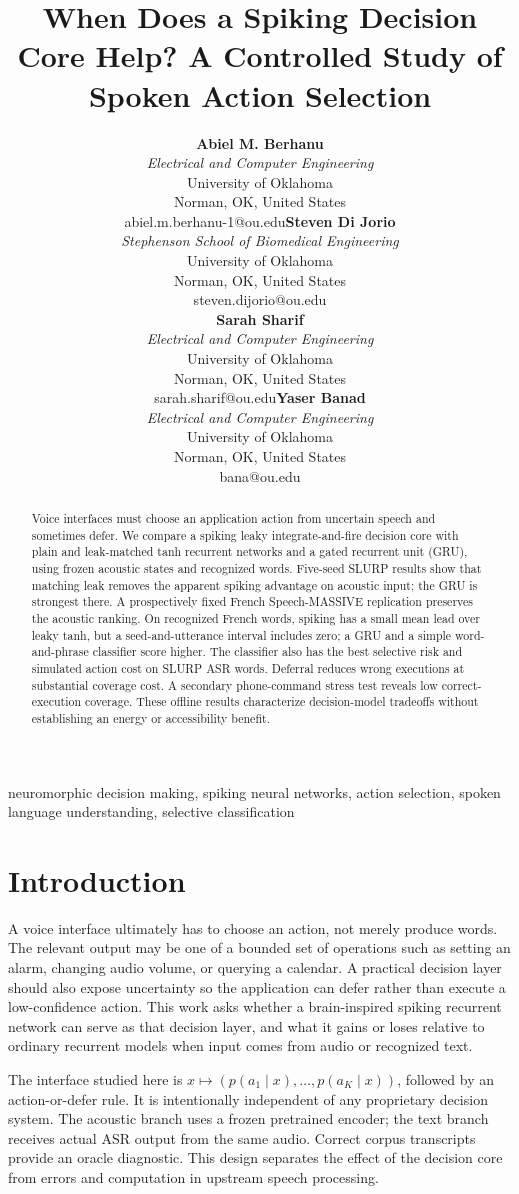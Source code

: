 \documentclass[conference]{IEEEtran}
\title{When Does a Spiking Decision Core Help? A Controlled Study of Spoken Action Selection}
\author{\begin{tabular}{cc}
\parbox{0.46\textwidth}{\centering\textbf{Abiel M. Berhanu}\\
\textit{Electrical and Computer Engineering}\\University of Oklahoma\\
Norman, OK, United States\\abiel.m.berhanu-1@ou.edu} &
\parbox{0.46\textwidth}{\centering\textbf{Steven Di Jorio}\\
\textit{Stephenson School of Biomedical Engineering}\\University of Oklahoma\\
Norman, OK, United States\\steven.dijorio@ou.edu}\\[1.5em]
\parbox{0.46\textwidth}{\centering\textbf{Sarah Sharif}\\
\textit{Electrical and Computer Engineering}\\University of Oklahoma\\
Norman, OK, United States\\sarah.sharif@ou.edu} &
\parbox{0.46\textwidth}{\centering\textbf{Yaser Banad}\\
\textit{Electrical and Computer Engineering}\\University of Oklahoma\\
Norman, OK, United States\\bana@ou.edu}
\end{tabular}}
\begin{document}
\maketitle

\begin{abstract}
Voice interfaces must choose an application action from uncertain speech and sometimes defer. We compare a spiking leaky integrate-and-fire decision core with plain and leak-matched tanh recurrent networks and a gated recurrent unit (GRU), using frozen acoustic states and recognized words. Five-seed SLURP results show that matching leak removes the apparent spiking advantage on acoustic input; the GRU is strongest there. A prospectively fixed French Speech-MASSIVE replication preserves the acoustic ranking. On recognized French words, spiking has a small mean lead over leaky tanh, but a seed-and-utterance interval includes zero; a GRU and a simple word-and-phrase classifier score higher. The classifier also has the best selective risk and simulated action cost on SLURP ASR words. Deferral reduces wrong executions at substantial coverage cost. A secondary phone-command stress test reveals low correct-execution coverage. These offline results characterize decision-model tradeoffs without establishing an energy or accessibility benefit.
\end{abstract}

\begin{IEEEkeywords}
neuromorphic decision making, spiking neural networks, action selection, spoken language understanding, selective classification
\end{IEEEkeywords}

\section{Introduction}
A voice interface ultimately has to choose an action, not merely produce words. The relevant output may be one of a bounded set of operations such as setting an alarm, changing audio volume, or querying a calendar. A practical decision layer should also expose uncertainty so the application can defer rather than execute a low-confidence action. This work asks whether a brain-inspired spiking recurrent network can serve as that decision layer, and what it gains or loses relative to ordinary recurrent models when input comes from audio or recognized text.

The interface studied here is $x\mapsto(p(a_1\mid x),\ldots,p(a_K\mid x))$, followed by an action-or-defer rule. It is intentionally independent of any proprietary decision system. The acoustic branch uses a frozen pretrained encoder; the text branch receives actual ASR output from the same audio. Correct corpus transcripts provide an oracle diagnostic. This design separates the effect of the decision core from errors and computation in upstream speech processing.
\end{document}
